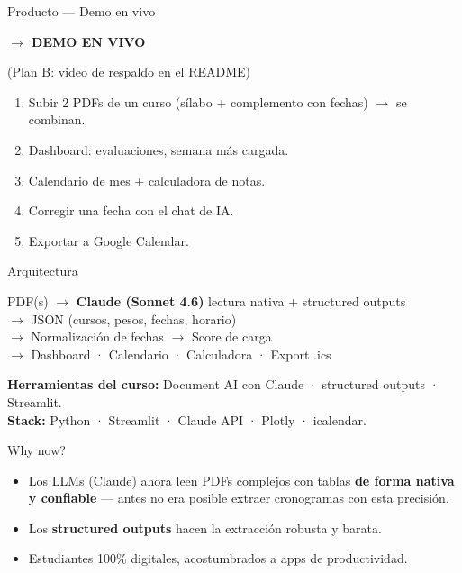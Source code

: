 \documentclass[aspectratio=169]{beamer}
\begin{document}
\begin{frame}{Producto — Demo en vivo}
  \begin{center}
    \Large \textcolor{cramlyIndigo}{\textbf{$\rightarrow$ DEMO EN VIVO}}\\[0.5cm]
  \end{center}
  \footnotesize (Plan B: video de respaldo en el README)
  \vspace{0.3cm}
  \begin{enumerate}
    \item Subir 2 PDFs de un curso (sílabo + complemento con fechas) $\rightarrow$ se combinan.
    \item Dashboard: evaluaciones, semana más cargada.
    \item Calendario de mes + calculadora de notas.
    \item Corregir una fecha con el chat de IA.
    \item Exportar a Google Calendar.
  \end{enumerate}
\end{frame}

\begin{frame}{Arquitectura}
  \begin{center}
    PDF(s) $\rightarrow$ \textbf{Claude (Sonnet 4.6)} lectura nativa + structured outputs\\[0.2cm]
    $\rightarrow$ JSON (cursos, pesos, fechas, horario)\\[0.2cm]
    $\rightarrow$ Normalización de fechas $\rightarrow$ Score de carga\\[0.2cm]
    $\rightarrow$ Dashboard · Calendario · Calculadora · Export .ics
  \end{center}
  \vspace{0.3cm}
  \footnotesize
  \textbf{Herramientas del curso:} Document AI con Claude · structured outputs · Streamlit.\\
  \textbf{Stack:} Python · Streamlit · Claude API · Plotly · icalendar.
\end{frame}

\begin{frame}{Why now?}
  \begin{itemize}
    \item Los LLMs (Claude) ahora leen PDFs complejos con tablas \textbf{de forma nativa y confiable} — antes no era posible extraer cronogramas con esta precisión.
    \item Los \textbf{structured outputs} hacen la extracción robusta y barata.
    \item Estudiantes 100\% digitales, acostumbrados a apps de productividad.
  \end{itemize}
\end{frame}
\end{document}
